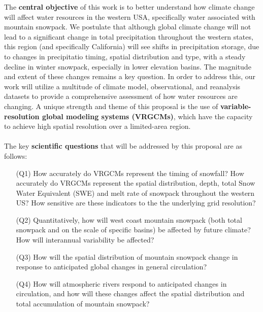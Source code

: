 \documentclass[11pt]{article}
\begin{document}
The \textbf{central objective} of this work is to better understand how climate change will affect water resources in the western USA, specifically water associated with mountain snowpack.  We postulate that although global climate change will not lead to a significant change in total precipitation throughout the western states, this region (and specifically California) will see shifts in precipitation storage, due to changes in precipitatio timing, spatial distribution and type, with a steady decline in winter snowpack, especially in lower elevation basins.  The magnitude and extent of these changes remains a key question.  In order to address this, our work will utilize a multitude of climate model, observational, and reanalysis datasets to provide a comprehensive assessment of how water resources are changing.  A unique strength and theme of this proposal is the use of \textbf{variable-resolution global modeling systems (VRGCMs)}, which have the capacity to achieve high spatial resolution over a limited-area region.
\\\\
The key \textbf{scientific questions} that will be addressed by this proposal are as follows:

\begin{itemize}
\item[(Q1)] How accurately do VRGCMs represent the timing of snowfall?  How accurately do VRGCMs represent the spatial distribution, depth, total Snow Water Equivalent (SWE) and melt rate of snowpack throughout the western US?  How sensitive are these indicators to the the underlying grid resolution?

\item[(Q2)] Quantitatively, how will west coast mountain snowpack (both total snowpack and on the scale of specific basins) be affected by future climate?  How will interannual variability be affected?

\item[(Q3)] How will the spatial distribution of mountain snowpack change in response to anticipated global changes in general circulation?

\item[(Q4)] How will atmospheric rivers respond to anticipated changes in circulation, and how will these changes affect the spatial distribution and total accumulation of mountain snowpack?
\end{itemize}
\end{document}
